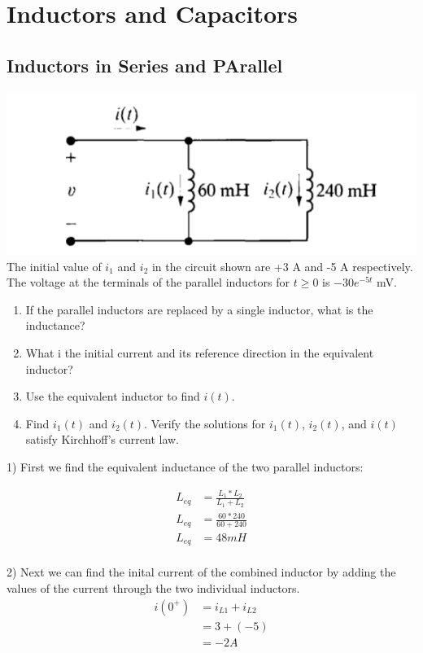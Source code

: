 \section{Inductors and Capacitors}

\subsection{Inductors in Series and PArallel}
\includegraphics[scale=0.5]{img/c6/p1} \\
The initial value of $i_1$ and $i_2$ in the circuit shown are +3 A and -5 A respectively. The
voltage at the terminals of the parallel inductors for $t \geq 0$ is $-30e^{-5t}$ mV. 

\begin{enumerate}
	\item If the parallel inductors are replaced by a single inductor, what is the inductance?
	\item What i the initial current and its reference direction in the equivalent inductor?
	\item Use the equivalent inductor to find $i(t)$. 
	\item Find $i_1(t)$ and $i_2(t)$. Verify the solutions for $i_1(t)$, $i_2(t)$, and $i(t)$ 
	satisfy Kirchhoff's current law. 
\end{enumerate}

1) First we find the equivalent inductance of the two parallel inductors:

\begin{align*}
	L_{eq} &= \frac{L_1 * L_2}{L_1 + L_2} \\
	L_{eq} &= \frac{60*240}{60+240} \\
	L_{eq} &= 48 mH \\
\end{align*}

2) Next we can find the inital current of the combined inductor by adding
the values of the current through the two individual inductors. \\
\begin{align*}
	i(0^{+}) &= i_{L1} + i_{L2} \\
		 &= 3 + (-5) \\
		 &= -2 A \\
\end{align*}

